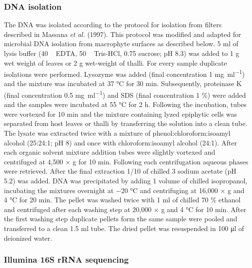 \documentclass[12pt,]{article}
\begin{document}
\hypertarget{dna-isolation}{%
\subsubsection{DNA isolation}\label{dna-isolation}}

The DNA was isolated according to the protocol for isolation from
filters described in Massana \emph{et al.} (1997). This protocol was
modified and adapted for microbial DNA isolation from macrophyte
surfaces as described below. 5 \si{\ml} of lysis buffer (40
\si{\milli\Molar} EDTA, 50 \si{\milli\Molar} Tris-HCl, 0.75 \si{\Molar}
sucrose; pH 8.3) was added to 1 \si{\g} wet weight of leaves or 2
\si{\g} wet-weight of thalli. For every sample duplicate isolations were
performed. Lysozyme was added (final concentration 1 \si{\mg\per\ml})
and the mixture was incubated at 37 \si{\degreeCelsius} for 30
\si{\minute}. Subsequently, proteinase K (final concentration 0.5
\si{\mg\per\ml}) and SDS (final concentration 1 \si{\percent}) were
added and the samples were incubated at 55 \si{\degreeCelsius} for 2
\si{\hour}. Following the incubation, tubes were vortexed for 10
\si{\minute} and the mixture containing lyzed epiphytic cells was
separated from host leaves or thalli by transferring the solution into a
clean tube. The lysate was extracted twice with a mixture of
phenol:chloroform:isoamyl alcohol (25:24:1; pH 8) and once with
chloroform:isoamyl alcohol (24:1). After each organic solvent mixture
addition tubes were slightly vortexed and centrifuged at 4,500 × g for
10 \si{\minute}. Following each centrifugation aqueous phases were
retrieved. After the final extraction 1/10 of chilled 3 \si{\Molar}
sodium acetate (pH 5.2) was added. DNA was precipitated by adding 1
volume of chilled isopropanol, incubating the mixtures overnight at
\num{-20} °C and centrifuging at 16,000 × g and 4 \si{\degreeCelsius}
for 20 \si{\minute}. The pellet was washed twice with 1 \si{\ml} of
chilled 70 \si{\percent} ethanol and centrifuged after each washing step
at 20,000 × g and 4 \si{\degreeCelsius} for 10 \si{\minute}. After the
first washing step duplicate pellets form the same sample were pooled
and transferred to a clean 1.5 \si{\ml} tube. The dried pellet was
resuspended in 100 \si{\ul} of deionized water.

\hypertarget{illumina-16s-rrna-sequencing}{%
\subsubsection{Illumina 16S rRNA
sequencing}\label{illumina-16s-rrna-sequencing}}
\end{document}

